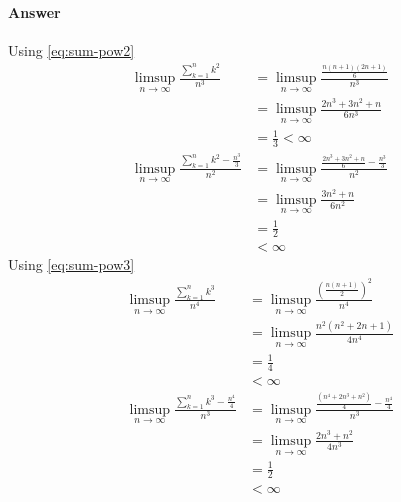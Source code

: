 \paragraph{Answer}
Using \eqref{eq:sum-pow2}
\begin{align*}
    \limsup_{n \rightarrow \infty} \frac{\sum_{k=1}^{n} k^2}{n^3}
        &= \limsup_{n \rightarrow \infty} \frac{\frac{n (n + 1) (2 n +
            1)}{6}}{n^3} \\
        &= \limsup_{n \rightarrow \infty} \frac{2 n^3 + 3 n^2 + n}{6 n^3} \\
        &= \frac{1}{3} < \infty \\
    \limsup_{n \rightarrow \infty} \frac{\sum_{k=1}^{n} k^2 - \frac{n^3}{3}}{n^2}
        &= \limsup_{n \rightarrow \infty} \frac{\frac{2 n^3 + 3 n^2 + n}{6} -
            \frac{n^3}{3}}{n^2} \\
        &= \limsup_{n \rightarrow \infty} \frac{3 n^2 + n}{6 n^2} \\
        &= \frac{1}{2} \\
        &< \infty
\end{align*}
Using \eqref{eq:sum-pow3}
\begin{align*}
    \limsup_{n \rightarrow \infty} \frac{\sum_{k=1}^{n} k^3}{n^4}
        &= \limsup_{n \rightarrow \infty} \frac{\left( \frac{n (n + 1)}{2}
            \right)^2}{n^4} \\
        &= \limsup_{n \rightarrow \infty} \frac{n^2 (n^2 + 2n + 1)}{4 n^4} \\
        &= \frac{1}{4} \\
        &< \infty \\
    \limsup_{n \rightarrow \infty} \frac{\sum_{k=1}^{n} k^3 - \frac{n^4}{4}}{n^3}
        &= \limsup_{n \rightarrow \infty} \frac{ \frac{(n^4 + 2 n^3 + n^2)}{4} -
            \frac{n^4}{4}}{n^3} \\
        &= \limsup_{n \rightarrow \infty} \frac{2 n^3 + n^2}{4 n^3} \\
        &= \frac{1}{2} \\
        &< \infty
\end{align*}
